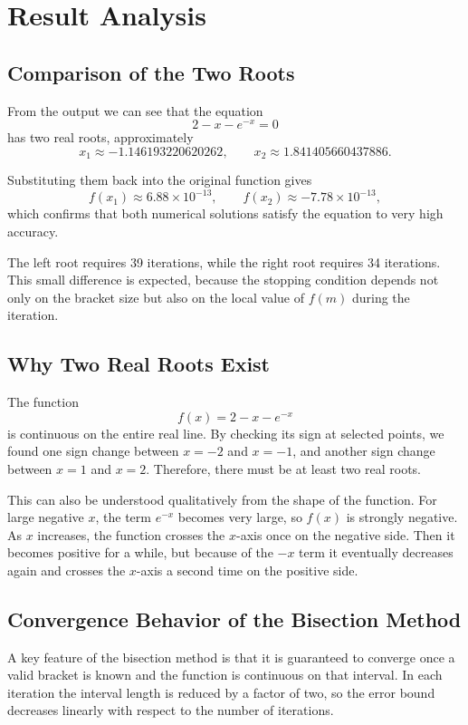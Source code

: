 \documentclass[12pt,a4paper]{article}
\begin{document}
\section{Result Analysis}

\subsection*{Comparison of the Two Roots}

From the output we can see that the equation
\[
2-x-e^{-x}=0
\]
has two real roots, approximately
\[
x_1\approx -1.146193220620262,
\qquad
x_2\approx 1.841405660437886.
\]

Substituting them back into the original function gives
\[
f(x_1)\approx 6.88\times 10^{-13},
\qquad
f(x_2)\approx -7.78\times 10^{-13},
\]
which confirms that both numerical solutions satisfy the equation to very high accuracy.

The left root requires 39 iterations, while the right root requires 34 iterations. This small difference is expected, because the stopping condition depends not only on the bracket size but also on the local value of $f(m)$ during the iteration.

\subsection*{Why Two Real Roots Exist}

The function
\[
f(x)=2-x-e^{-x}
\]
is continuous on the entire real line. By checking its sign at selected points, we found one sign change between $x=-2$ and $x=-1$, and another sign change between $x=1$ and $x=2$. Therefore, there must be at least two real roots.

This can also be understood qualitatively from the shape of the function. For large negative $x$, the term $e^{-x}$ becomes very large, so $f(x)$ is strongly negative. As $x$ increases, the function crosses the $x$-axis once on the negative side. Then it becomes positive for a while, but because of the $-x$ term it eventually decreases again and crosses the $x$-axis a second time on the positive side.

\subsection*{Convergence Behavior of the Bisection Method}

A key feature of the bisection method is that it is guaranteed to converge once a valid bracket is known and the function is continuous on that interval. In each iteration the interval length is reduced by a factor of two, so the error bound decreases linearly with respect to the number of iterations.
\end{document}

